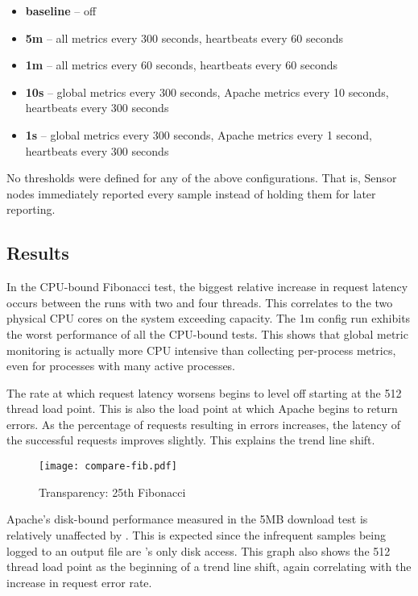 \begin{itemize}
\item \textbf{baseline} -- \dcamp off
\item \textbf{5m} -- all metrics every 300 seconds, heartbeats every 60 seconds
\item \textbf{1m} -- all metrics every 60 seconds, heartbeats every 60 seconds
\item \textbf{10s} -- global metrics every 300 seconds, Apache metrics every 10 seconds, heartbeats every 300 seconds
\item \textbf{1s} -- global metrics every 300 seconds, Apache metrics every 1 second, heartbeats every 300 seconds
\end{itemize}

No thresholds were defined for any of the above configurations. That is, Sensor nodes immediately reported every sample
instead of holding them for later reporting.

\subsection{Results}

In the CPU-bound Fibonacci test, the biggest relative increase in request latency occurs between the runs with two and
four threads. This correlates to the two physical CPU cores on the system exceeding capacity. The 1m config run exhibits
the worst performance of all the CPU-bound tests. This shows that global metric monitoring is actually more CPU
intensive than collecting per-process metrics, even for processes with many active processes.

The rate at which request latency worsens begins to level off starting at the 512 thread load point. This is also the
load point at which Apache begins to return errors. As the percentage of requests resulting in errors increases, the
latency of the successful requests improves slightly. This explains the trend line shift.

\begin{figure}[H]
    \centering
    \vspace{-20pt}
    \texttt{[image: compare-fib.pdf]}
    \vspace{-50pt}
    \caption{Transparency: 25th Fibonacci}
    \label{fig:fib25_graph}
\end{figure}

Apache's disk-bound performance measured in the 5MB download test is relatively unaffected by \dcampns. This is expected
since the infrequent samples being logged to an output file are \dcampns's only disk access. This graph also shows the 512
thread load point as the beginning of a trend line shift, again correlating with the increase in request error rate.


